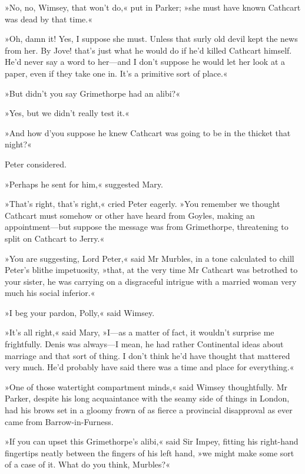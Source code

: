 »No, no, Wimsey, that won't do,« put in Parker; »she must have known Cathcart was dead by that time.«

»Oh, damn it! Yes, I suppose she must. Unless that surly old devil kept the news from her. By Jove! that's just what he would do if he'd killed Cathcart himself. He'd never say a word to her\allowbreak---\allowbreak and I don't suppose he would let her look at a paper, even if they take one in. It's a primitive sort of place.«

»But didn't you say Grimethorpe had an alibi?«

»Yes, but we didn't really test it.«

»And how d'you suppose he knew Cathcart was going to be in the thicket that night?«

Peter considered.

»Perhaps he sent for him,« suggested Mary.

»That's right, that's right,« cried Peter eagerly. »You remember we thought Cathcart must somehow or other have heard from Goyles, making an appointment\allowbreak---\allowbreak but suppose the message was from Grimethorpe, threatening to split on Cathcart to Jerry.«

»You are suggesting, Lord Peter,« said Mr Murbles, in a tone calculated to chill Peter's blithe impetuosity, »that, at the very time Mr Cathcart was betrothed to your sister, he was carrying on a disgraceful intrigue with a married woman very much his social inferior.«

»I beg your pardon, Polly,« said Wimsey.

»It's all right,« said Mary, »I\allowbreak---\allowbreak as a matter of fact, it wouldn't surprise me frightfully. Denis was always\allowbreak---\allowbreak I mean, he had rather Continental ideas about marriage and that sort of thing. I don't think he'd have thought that mattered very much. He'd probably have said there was a time and place for everything.«

»One of those watertight compartment minds,« said Wimsey thoughtfully.  Mr Parker, despite his long acquaintance with the seamy side of things in London, had his brows set in a gloomy frown of as fierce a provincial disapproval as ever came from Barrow-in-Furness.

»If you can upset this Grimethorpe's alibi,« said Sir Impey, fitting his right-hand fingertips neatly between the fingers of his left hand, »we might make some sort of a case of it. What do you think, Murbles?«

